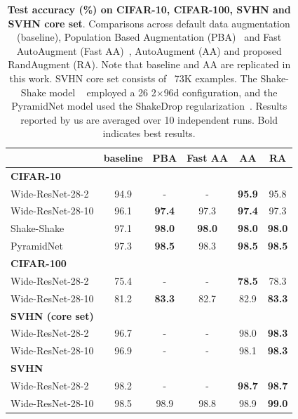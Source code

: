 \begin{table}[t]
\centering
\footnotesize
\begin{tabular}{l|cccc|c}
  & {\small baseline}        & PBA & Fast AA &   AA    &  RA \\
  \hline 
  \textbf{CIFAR-10} &&&&&\\
Wide-ResNet-28-2 & 94.9 & - & - & \textbf{95.9} & 95.8  \\ 
  Wide-ResNet-28-10 & 96.1 & \textbf{97.4} & 97.3 & \textbf{97.4} & 97.3  \\ 
  Shake-Shake  & 97.1 & \textbf{98.0} & \textbf{98.0} & \textbf{98.0} & \textbf{98.0}  \\ 
  PyramidNet  & 97.3 & \textbf{98.5} & 98.3 & \textbf{98.5} & \textbf{98.5} \\ 
  \hline
  \textbf{CIFAR-100} &&&&&\\
  Wide-ResNet-28-2 & 75.4 & - & - & \textbf{78.5} & 78.3 \\  
  Wide-ResNet-28-10 & 81.2 & \textbf{83.3} & 82.7 & 82.9 & \textbf{83.3}  \\ 
  \hline  
  \textbf{SVHN (core set)} &&&&&\\
  Wide-ResNet-28-2 & 96.7 & -  & - & 98.0 & \textbf{98.3}  \\ 
  Wide-ResNet-28-10 & 96.9 & -  & - & 98.1 & \textbf{98.3}  \\ 
  \hline  
  \textbf{SVHN} &&&&&\\
  Wide-ResNet-28-2 & 98.2 & - & - & \textbf{98.7}  & \textbf{98.7} \\
  Wide-ResNet-28-10 & 98.5 &98.9  & 98.8 & 98.9 & \textbf{99.0}  \\ 
  \hline
\end{tabular}
\vspace{0.2cm}
\caption{\textbf{Test accuracy (\%) on CIFAR-10, CIFAR-100, SVHN and SVHN core set}. Comparisons across default data augmentation (baseline), Population Based Augmentation (PBA)~\cite{ho2019population} and Fast AutoAugment (Fast AA)~\cite{lim2019fast}, AutoAugment (AA) \cite{cubuk2018autoaugment} and proposed RandAugment (RA). Note that baseline and AA are replicated in this work. SVHN core set consists of ~73K examples. The Shake-Shake model ~\cite{gastaldi2017shake} employed a 26 2$\times$96d configuration, and the
PyramidNet model used the ShakeDrop regularization~\cite{yamada2018shakedrop}. Results reported by us are averaged over 10 independent runs. Bold indicates best results.}
\label{tab:small_results}  
\end{table}
